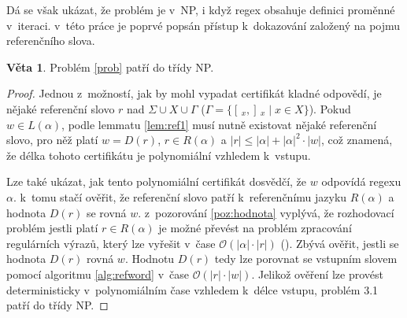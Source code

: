 \documentclass[thesis=B,czech]{FITthesis}[2019/12/23]
\theoremstyle{definition}
\newtheorem{theorem}{Věta}[chapter]
\begin{document}
Dá se však ukázat, že problém je v~NP, i když regex obsahuje definici proměnné v~iteraci. v~této práce je poprvé popsán přístup k~dokazování založený na pojmu referenčního slova.

\begin{theorem}
Problém \ref{prob} patří do třídy NP.
\end{theorem}
\begin{proof} Jednou z~možností, jak by mohl vypadat certifikát kladné odpovědí, je nějaké referenční slovo $r$ nad $\Sigma \cup X \cup \Gamma$ ($\Gamma = \{ [\,_x , ]\,_x \mid x \in X \}$). Pokud $w \in L\left(\alpha\right)$, podle lemmatu \ref{lem:ref1} musí nutně existovat nějaké referenční slovo, pro něž platí $w = D\left(r\right)$, $r \in R\left(\alpha\right)$ a $ |r| \le |\alpha|+|\alpha|^2\cdot|w|$, což znamená, že délka tohoto certifikátu je polynomiální vzhledem k~vstupu.

Lze také ukázat, jak tento polynomiální certifikát dosvědčí, že $w$ odpovídá regexu $\alpha$. k~tomu stačí ověřit, že referenční slovo patří k~referenčnímu jazyku $R\left(\alpha\right)$ a hodnota $D\left(r\right)$ se rovná $w$. z~pozorování \ref{poz:hodnota} vyplývá, že rozhodovací problém jestli platí $r \in R(\alpha)$ je možné převést na problém zpracování regulárních výrazů, který lze vyřešit v~čase $\mathcal{O}\left(|\alpha| \cdot |r|\right)$ (\cite[s. 282--285]{alfred2014algorithms}). Zbývá ověřit, jestli se hodnota $D\left(r\right)$ rovná $w$. Hodnotu $D\left(r\right)$ tedy lze porovnat se vstupním slovem pomocí algoritmu \ref{alg:refword} v~čase $\mathcal{O}(|r|\cdot|w|)$. Jelikož ověření lze provést deterministicky v~polynomiálním čase vzhledem k~délce vstupu, problém 3.1 patří do třídy NP.
\end{proof}
\end{document}
